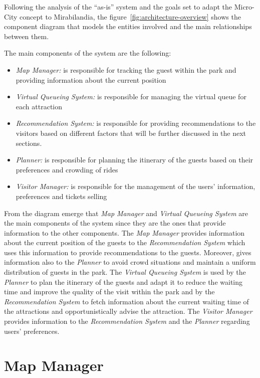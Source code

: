Following the analysis of the ``as-is'' system and the goals set %
to adapt the Micro-City concept to Mirabilandia, the figure~\ref{fig:architecture-overview} shows the component diagram that models the entities involved and the main relationships between them.

The main components of the system are the following:

\begin{itemize}
	\item \textit{Map Manager:} is responsible for tracking the guest within the park and providing information about the current position
	\item \textit{Virtual Queueing System:} is responsible for managing the virtual queue for each attraction
	\item \textit{Recommendation System:} is responsible for providing recommendations to the visitors based on different factors that will be further discussed in the next sections.
	\item \textit{Planner:} is responsible for planning the itinerary of the guests based on their preferences and crowding of rides
	\item \textit{Visitor Manager:} is responsible for the management of the users' information, preferences and tickets selling 
\end{itemize}

From the diagram emerge that \textit{Map Manager} and \textit{Virtual Queueing System} are the main components of the system since they are the ones
that provide information to the other components. The \textit{Map Manager} provides information about the current position of the guests
to the \textit{Recommendation System} which uses this information to provide recommendations to the guests. Moreover, gives information also to the
\textit{Planner} to avoid crowd situations and maintain a uniform distribution of guests in the park. The \textit{Virtual Queueing System} is used by
the \textit{Planner} to plan the itinerary of the guests and adapt it to reduce the waiting time and improve the quality of the visit within the park
and by the \textit{Recommendation System} to fetch information about the current waiting time of the attractions and opportunistically advise the attraction.
The \textit{Visitor Manager} provides information to the \textit{Recommendation System} and the \textit{Planner} regarding users' preferences.

\section{Map Manager}

